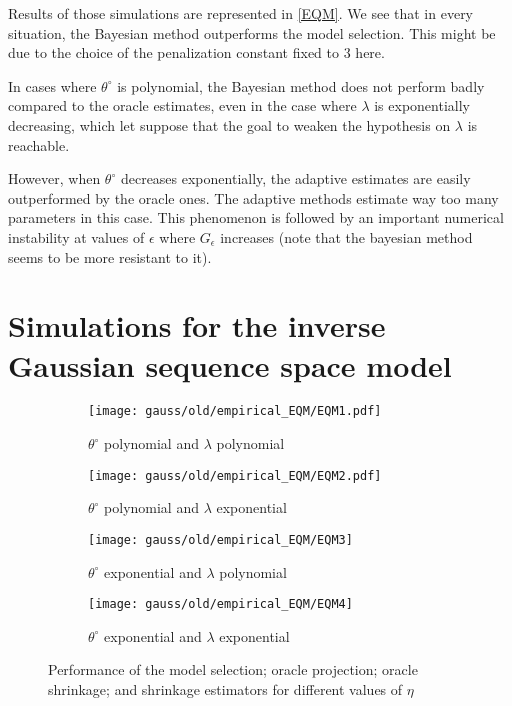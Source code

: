 Results of those simulations are represented in \textsc{\autoref{EQM}}.
We see that in every situation, the Bayesian method outperforms the model selection.
This might be due to the choice of the penalization constant fixed to $3$ here.

\medskip

In cases where $\theta^{\circ}$ is polynomial, the Bayesian method does not perform badly compared to the oracle estimates, even in the case where $\lambda$ is exponentially decreasing, which let suppose that the goal to weaken the hypothesis on $\lambda$ is reachable.

However, when $\theta^{\circ}$ decreases exponentially, the adaptive estimates are easily outperformed by the oracle ones.
The adaptive methods estimate way too many parameters in this case.
This phenomenon is followed by an important numerical instability at values of $\epsilon$ where $G_{\epsilon}$ increases (note that the bayesian method seems to be more resistant to it).


\section{Simulations for the inverse Gaussian sequence space model}\label{D.1}

\begin{figure}
\centering
\begin{subfigure}{.5\textwidth}
  \centering
  \texttt{[image: gauss/old/empirical\_EQM/EQM1.pdf]}
  \caption{$\theta^{\circ}$ polynomial and $\lambda$ polynomial}
  \label{fig3:sub1}
\end{subfigure}%
\begin{subfigure}{.5\textwidth}
  \centering
  \texttt{[image: gauss/old/empirical\_EQM/EQM2.pdf]}
  \caption{$\theta^{\circ}$ polynomial and $\lambda$ exponential}
  \label{fig3:sub2}
\end{subfigure}
\begin{subfigure}{.5\textwidth}
  \centering
  \texttt{[image: gauss/old/empirical\_EQM/EQM3]}
  \caption{$\theta^{\circ}$ exponential and $\lambda$ polynomial}
  \label{fig3:sub3}
\end{subfigure}%
\begin{subfigure}{.5\textwidth}
  \centering
  \texttt{[image: gauss/old/empirical\_EQM/EQM4]}
  \caption{$\theta^{\circ}$ exponential and $\lambda$ exponential}
  \label{fig3:sub4}
\end{subfigure}
\caption{Performance of the model selection; oracle projection; oracle shrinkage; and shrinkage estimators for different values of $\eta$ }
\label{EQM}
\end{figure}




